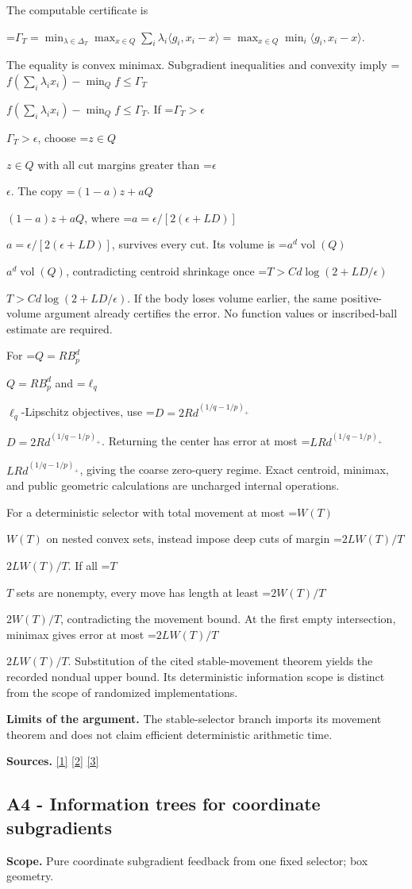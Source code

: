 \documentclass[10pt,a4paper]{article}
\newcommand{\AtlasMath}[1]{\par\begingroup\centering\setbox0=\hbox{$\displaystyle #1$}\ifdim\wd0>1.4\linewidth\typeout{ATLAS WIDE FORMULA: \the\wd0}\fi\ifdim\wd0>\linewidth\resizebox{\linewidth}{!}{\box0}\else\box0\fi\par\endgroup}
\newcommand{\AtlasInlineMath}[1]{\begingroup\setbox0=\hbox{$#1$}\ifdim\wd0>.4\linewidth\endgroup\AtlasMath{#1}\else\endgroup$#1$\fi}
\begin{document}
The computable certificate is

\AtlasMath{\Gamma_T=\min_{\lambda\in\Delta_T}\max_{x\in Q}\sum_i\lambda_i\langle g_i,x_i-x\rangle
=\max_{x\in Q}\min_i\langle g_i,x_i-x\rangle.}

The equality is convex minimax. Subgradient inequalities and convexity imply
\AtlasInlineMath{f(\sum_i\lambda_ix_i)-\min_Qf\le\Gamma_T}.
If \AtlasInlineMath{\Gamma_T>\epsilon}, choose \AtlasInlineMath{z\in Q} with all cut margins greater than \AtlasInlineMath{\epsilon}. The copy \AtlasInlineMath{(1-a)z+aQ}, where \AtlasInlineMath{a=\epsilon/[2(\epsilon+LD)]}, survives every cut. Its volume is \AtlasInlineMath{a^d\operatorname{vol}(Q)}, contradicting centroid shrinkage once \AtlasInlineMath{T>C d\log(2+LD/\epsilon)}. If the body loses volume earlier, the same positive-volume argument already certifies the error. No function values or inscribed-ball estimate are required.

For \AtlasInlineMath{Q=RB_p^d} and \AtlasInlineMath{\ell_q}-Lipschitz objectives, use \AtlasInlineMath{D=2Rd^{(1/q-1/p)_+}}. Returning the center has error at most \AtlasInlineMath{LRd^{(1/q-1/p)_+}}, giving the coarse zero-query regime. Exact centroid, minimax, and public geometric calculations are uncharged internal operations.

For a deterministic selector with total movement at most \AtlasInlineMath{W(T)} on nested convex sets, instead impose deep cuts of margin \AtlasInlineMath{2LW(T)/T}. If all \AtlasInlineMath{T} sets are nonempty, every move has length at least \AtlasInlineMath{2W(T)/T}, contradicting the movement bound. At the first empty intersection, minimax gives error at most \AtlasInlineMath{2LW(T)/T}. Substitution of the cited stable-movement theorem yields the recorded nondual upper bound. Its deterministic information scope is distinct from the scope of randomized implementations.

\textbf{Limits of the argument.} The stable-selector branch imports its movement theorem and does not claim efficient deterministic arithmetic time.

\textbf{Sources.} \href{https://arxiv.org/pdf/1405.4980}{[1]} \href{https://www2.isye.gatech.edu/~nemirovs/MOR_AccuracyCertificates.pdf}{[2]} \href{https://arxiv.org/pdf/2609.20701}{[3]}

\subsection{A4 - Information trees for coordinate subgradients}
\textbf{Scope.} Pure coordinate subgradient feedback from one fixed selector; box geometry.
\end{document}
